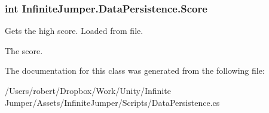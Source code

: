 \subsubsection[{Score}]{\setlength{\rightskip}{0pt plus 5cm}int Infinite\+Jumper.\+Data\+Persistence.\+Score\hspace{0.3cm}{\ttfamily [get]}}\label{class_infinite_jumper_1_1_data_persistence_a7613cf64f86c5ef25aedcfe1f3b3aaf0}


Gets the high score. Loaded from file. 

The score.

The documentation for this class was generated from the following file\+:\begin{DoxyCompactItemize}
\item 
/\+Users/robert/\+Dropbox/\+Work/\+Unity/\+Infinite Jumper/\+Assets/\+Infinite\+Jumper/\+Scripts/Data\+Persistence.\+cs\end{DoxyCompactItemize}
